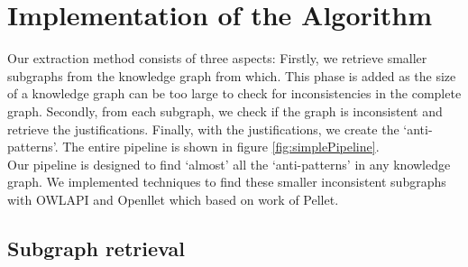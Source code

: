 \documentclass[11pt,letterpaper ,oneside ]{book}
\begin{document}
	\section{Implementation of the Algorithm}
	Our extraction method consists of three aspects: Firstly, we retrieve smaller subgraphs from the knowledge graph from which. This phase is added as the size of a knowledge graph can be too large to check for inconsistencies in the complete graph. Secondly, from each subgraph, we check if the graph is inconsistent and retrieve the justifications. Finally, with the justifications, we create the `anti-patterns'. The entire pipeline is shown in figure \ref{fig:simplePipeline}.\\
	Our pipeline is designed to find `almost' all the `anti-patterns' in any knowledge graph. We implemented techniques to find these smaller inconsistent subgraphs with OWLAPI\cite{Horridge:2011} and Openllet\cite{Openllet:2019} which based on work of Pellet\cite{Pellet:2007}.\\
	
	\subsection{Subgraph retrieval}
		\begin{figure}[!t]
	\end{figure}
\end{document}
